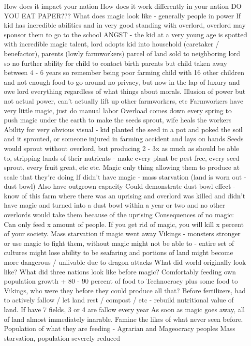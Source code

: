 \documentclass[blue]{GL2020}
\begin{document}
How does it impact your nation
How does it work differently in your nation
DO YOU EAT PAPER???
What does magic look like - generally people in power
If kid has incredible abilities and in very good standing with overlord, overlord may sponsor them to go to the school
ANGST - the kid at a very young age is spotted with incredible magic talent, lord adopts kid into household (caretaker / benefactor), parents (lowly farmworkers) parcel of land sold to neighboring lord so no further ability for child to contact birth parents but child taken away between 4 - 6 years so remember being poor farming child with 16 other children and not enough food to go around no privacy, but now in the lap of luxury and owe lord everything regardless of what things about morals.  
Illusion of power but not actual power, can’t actually lift up other farmworkers, etc
Farmworkers have very little magic, just do manual labor
Overload comes down every spring to push magic under the earth to make the seeds sprout, wife heals the workers
Ability for very obvious visual - kid planted the seed in a pot and poked the soil and it sprouted, or someone injured in farming accident and lays on hands
Seeds would sprout without overlord, but producing 2 - 3x as much as should be able to, stripping lands of their nutrients - make every plant be pest free, every seed sprout, every fruit great, etc etc.  Magic only thing allowing them to produce at scale that they’re doing
If didn’t have magic - mass starvation (land is worn out - dust bowl)  Also have outgrown capacity
Could demonstrate dust bowl effect - know of this farm where there was an uprising and overlord was killed and didn’t have magic and turned into a dust bowl within a year or two and no other overlords would take them because of the uprising
Consequences of no magic:
Can only feed x amount of people.  If you get rid of magic, you will kill x percent of your society.  Mass starvation if magic went away
Vikings - monsters stronger or use magic to fight them, without magic might not be able to - entire set of cultures might lose ability to be seafaring and portions of land might become more dangerous / unlivable due to dragon attacks
What did world originally look like?  What did three nations look like before magic?
Comfortably feeding own population growth + 80 - 90 percent of food to Technocracy plus some food to Vikings, who were they before they could produce all that?
Before fertilizers, had to actively fallow / let land rest / compost / etc - rebuild nutritional value of land.  If have 7 fields, 3 or 4 are fallow every year
As soon as magic goes away, all of land almost immediately inarable.  Famine the likes of what never seen before.  Population of what they are feeding - Agrarian and Mageocracy peoples
Mass starvation, population severely reduced
\end{document}
